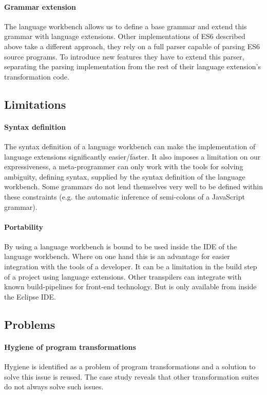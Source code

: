 \paragraph{Grammar extension}
The language workbench allows us to define a base grammar and extend this grammar with language extensions. Other implementations of ES6 described above take a different approach, they rely on a full parser capable of parsing ES6 source programs. To introduce new features they have to extend this parser, separating the parsing implementation from the rest of their language extension's transformation code.

\subsection{Limitations}

\paragraph{Syntax definition}
The syntax definition of a language workbench can make the implementation of language extensions significantly easier/faster. It also imposes a limitation on our expressiveness, a meta-programmer can only work with the tools for solving ambiguity, defining syntax, supplied by the syntax definition of the language workbench. Some grammars do not lend themselves very well to be defined within these constraints (e.g. the automatic inference of semi-colons of a JavaScript grammar).

\paragraph{Portability}
By using a language workbench \projectname is bound to be used inside the IDE of the language workbench. Where on one hand this is an advantage for easier integration with the tools of a developer. It can be a limitation in the build step of a project using language extensions. Other transpilers can integrate with known build-pipelines for front-end technology. But \projectname is only available from inside the Eclipse IDE. 

\subsection{Problems}

\paragraph{Hygiene of program transformations}
Hygiene is identified as a problem of program transformations and a solution to solve this issue is reused. The case study reveals that other transformation suites do not always solve such issues.